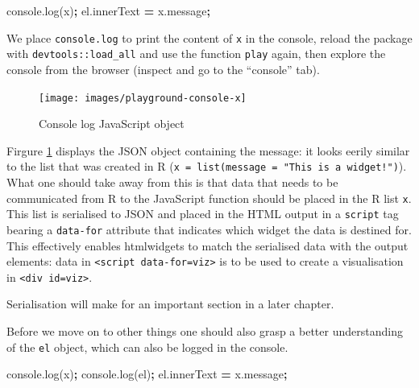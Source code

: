 \documentclass[10pt,]{krantz}
\makeatletter
\newenvironment{Shaded}{\begin{snugshade}}{\end{snugshade}}
\newcommand{\AttributeTok}[1]{\textcolor[rgb]{0.61,0.61,0.61}{#1}}
\newcommand{\NormalTok}[1]{#1}
\newcommand{\OperatorTok}[1]{\textcolor[rgb]{0.43,0.43,0.43}{\textbf{#1}}}
\newcommand{\VariableTok}[1]{\textcolor[rgb]{0,0,0}{#1}}
\newenvironment{kframe}{%
\medskip{}
\setlength{\fboxsep}{.8em}
 \def\at@end@of@kframe{}%
 \ifinner\ifhmode%
  \def\at@end@of@kframe{\end{minipage}}%
  \begin{minipage}{\columnwidth}%
 \fi\fi%
 \def\FrameCommand##1{\hskip\@totalleftmargin \hskip-\fboxsep
 \colorbox{shadecolor}{##1}\hskip-\fboxsep
     \hskip-\linewidth \hskip-\@totalleftmargin \hskip\columnwidth}%
 \MakeFramed {\advance\hsize-\width
   \@totalleftmargin\z@ \linewidth\hsize
   \@setminipage}}%
 {\par\unskip\endMakeFramed%
 \at@end@of@kframe}
\renewenvironment{Shaded}{\begin{kframe}}{\end{kframe}}
\newenvironment{rmdblock}[1]
  {
  \begin{itemize}
  \renewcommand{\labelitemi}{
    \raisebox{-.7\height}[0pt][0pt]{
      {\setkeys{Gin}{width=3em,keepaspectratio}\texttt{[image: images/\#1]}}
    }
  }
  \setlength{\fboxsep}{1em}
  \begin{kframe}
  \item
  }
  {
  \end{kframe}
  \end{itemize}
  }
\newenvironment{rmdnote}
  {\begin{rmdblock}{note}}
  {\end{rmdblock}}
\makeatother
\begin{document}
\begin{Shaded}
\begin{Highlighting}[]
\VariableTok{console}\NormalTok{.}\AttributeTok{log}\NormalTok{(x)}\OperatorTok{;}
\VariableTok{el}\NormalTok{.}\AttributeTok{innerText} \OperatorTok{=} \VariableTok{x}\NormalTok{.}\AttributeTok{message}\OperatorTok{;}
\end{Highlighting}
\end{Shaded}

We place \texttt{console.log} to print the content of \texttt{x} in the console, reload the package with \texttt{devtools::load\_all} and use the function \texttt{play} again, then explore the console from the browser (inspect and go to the ``console'' tab).

\begin{figure}[H]

{\centering \texttt{[image: images/playground-console-x]} 

}

\caption{Console log JavaScript object}\label{fig:playground-console}
\end{figure}

Firgure \ref{fig:playground-console} displays the JSON object containing the message: it looks eerily similar to the list that was created in R (\texttt{x\ =\ list(message\ =\ "This\ is\ a\ widget!")}). What one should take away from this is that data that needs to be communicated from R to the JavaScript function should be placed in the R list \texttt{x}. This list is serialised to JSON and placed in the HTML output in a \texttt{script} tag bearing a \texttt{data-for} attribute that indicates which widget the data is destined for. This effectively enables htmlwidgets to match the serialised data with the output elements: data in \texttt{\textless{}script\ data-for=\textquotesingle{}viz\textquotesingle{}\textgreater{}} is to be used to create a visualisation in \texttt{\textless{}div\ id=\textquotesingle{}viz\textquotesingle{}\textgreater{}}.

\begin{rmdnote}
Serialisation will make for an important section in a later chapter.
\end{rmdnote}

Before we move on to other things one should also grasp a better understanding of the \texttt{el} object, which can also be logged in the console.

\begin{Shaded}
\begin{Highlighting}[]
\VariableTok{console}\NormalTok{.}\AttributeTok{log}\NormalTok{(x)}\OperatorTok{;}
\VariableTok{console}\NormalTok{.}\AttributeTok{log}\NormalTok{(el)}\OperatorTok{;}
\VariableTok{el}\NormalTok{.}\AttributeTok{innerText} \OperatorTok{=} \VariableTok{x}\NormalTok{.}\AttributeTok{message}\OperatorTok{;}
\end{Highlighting}
\end{Shaded}
\end{document}
